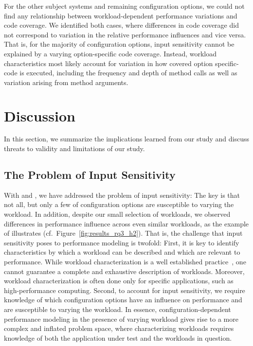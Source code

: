 For the other subject systems and remaining configuration options, we could not find any relationship between workload-dependent performance variations and code coverage. We identified both cases, where differences in code coverage did not correspond to variation in the relative performance influences and vice versa. That is, for the majority of configuration options, input sensitivity cannot be explained by a varying option-specific code coverage. Instead, workload characteristics most likely account for variation in how covered option specific-code is executed, including the frequency and depth of method calls as well as variation arising from method arguments.
\vspace{1mm}

\section{Discussion}\label{sec:discussion}
In this section, we summarize the implications learned from our study and discuss threats to validity and limitations of our study.
\subsection{The Problem of Input Sensitivity}\label{sec:discusssion_challenge}
With  and , we have addressed the problem of input sensitivity: The key is that not all, but only a few of configuration options are susceptible to varying the workload. In addition, despite our small selection of workloads, we observed differences in performance influence across even similar workloads, as the example of \htwo illustrates (cf.~Figure~\ref{fig:results_rq3_h2}). That is, the challenge that input sensitivity poses to performance modeling is twofold: First, it is key to identify characteristics by which a workload can be described and which are relevant to performance. While workload characterization is a well established practice~\cite{ceesay2020,papadopoulos2021}, one cannot guarantee a complete and exhaustive description of workloads. Moreover, workload characterization is often done only for specific applications, such as high-performance computing. Second, to account for input sensitivity, we require knowledge of which configuration options have an influence on performance and are susceptible to varying the workload. In essence, configuration-dependent performance modeling in the presence of varying workload gives rise to a more complex and inflated problem space, where characterizing workloads requires knowledge of both the application under test and the workloads in question.

